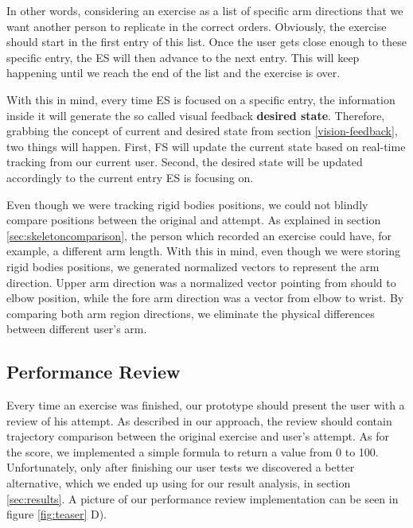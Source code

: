 In other words, considering an exercise as a list of specific arm directions that we want another person to replicate in the correct orders. 
Obviously, the exercise should start in the first entry of this list. 
Once the user gets close enough to these specific entry, the \ac{ES} will then advance to the next entry. 
This will keep happening until we reach the end of the list and the exercise is over.

With this in mind, every time \ac{ES} is focused on a specific entry, the information inside it will generate the so called visual feedback \textbf{desired state}. 
Therefore, grabbing the concept of current and desired state from section \ref{vision-feedback}, two things will happen. 
First, \ac{FS} will update the current state based on real-time tracking from our current user. 
Second, the desired state will be updated accordingly to the current entry \ac{ES} is focusing on.

Even though we were tracking rigid bodies positions, we could not blindly compare positions between the original and attempt.
As explained in section \ref{sec:skeletoncomparison}, the person which recorded an exercise could have, for example, a different arm length.
With this in mind, even though we were storing rigid bodies positions, we generated normalized vectors to represent the arm direction. 
Upper arm direction was a normalized vector pointing from should to elbow position, while the fore arm direction was a vector from elbow to wrist.
By comparing both arm region directions, we eliminate the physical differences between different user's arm.

\subsection{Performance Review}

Every time an exercise was finished, our prototype should present the user with a review of his attempt. 
As described in our approach, the review should contain trajectory comparison between the original exercise and user's attempt.
As for the score, we implemented a simple formula to return a value from 0 to 100. 
Unfortunately, only after finishing our user tests we discovered a better alternative, which we ended up using for our result analysis, in section \ref{sec:results}.
A picture of our performance review implementation can be seen in figure \ref{fig:teaser} D).
